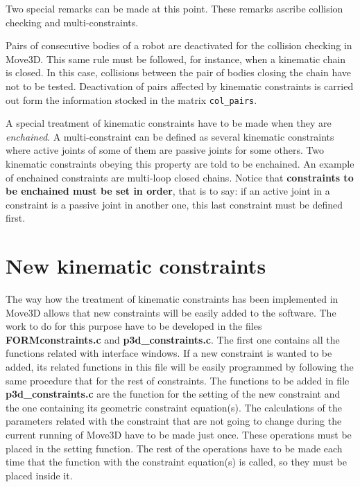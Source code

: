 Two special remarks can be made at this point. These remarks ascribe
collision checking and multi-constraints.

Pairs of consecutive bodies
of a robot are deactivated for the collision checking in Move3D. This
same rule must be followed, for instance, when a kinematic chain is
closed. In this case, collisions between the pair of bodies closing the
chain have not to be tested. Deactivation of pairs affected by
kinematic constraints is carried out form the information stocked in the 
matrix {\tt col\_pairs}.

A special treatment of kinematic constraints have to be made when they
are {\em enchained}. A multi-constraint can be defined as several
kinematic constraints where active joints of some of them are passive
joints for some others. Two kinematic constraints obeying this property are
told to be enchained. An example of enchained constraints are
multi-loop closed chains. Notice that {\bf constraints to
  be enchained must be set in order}, that is to say: if an active
joint in a constraint is a passive joint in another one, this last
constraint must be defined first.


\section{New kinematic constraints}

The way how the treatment of kinematic constraints has been
implemented in Move3D allows that new constraints will be easily added
to the software. The work to do for this purpose have to be developed in the files {\bf
  FORMconstraints.c} and {\bf p3d\_constraints.c}. The first one
contains all the functions related with interface windows. If a new
constraint is wanted to be added, its related functions in this file
will be easily programmed by following the same procedure that for the
rest of constraints. The functions to be added in file {\bf
  p3d\_constraints.c} are the function for the setting of the new
constraint and the one containing its geometric constraint
equation(s). The calculations of the parameters related with the
constraint that are not going to change during the current running of Move3D
have to be made just once. These operations must be placed in the
setting function. The rest of the operations have to be made each time 
that the function with the constraint equation(s) is called, so they
must be placed inside it.

